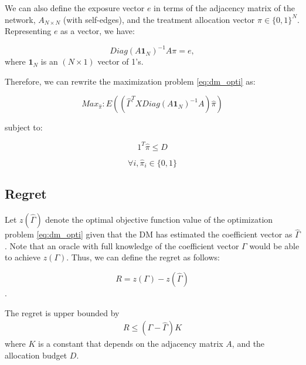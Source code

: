 \documentclass[12pt,a4paper]{article}
\begin{document}
We can also define the exposure vector $e$ in terms of the adjacency matrix of the network, $A_{N \times N}$ (with self-edges), and the treatment allocation vector $\pi \in \{0,1\}^N$.\\

Representing $e$ as a vector, we have: 

$$Diag(A \mathbf{1}_{N} ) ^{-1} A\pi  = e,$$
where $\mathbf{1}_{N}$ is an $(N \times 1)$ vector of 1's.

Therefore, we can rewrite the maximization problem \eqref{eq:dm_opti} as:

$$Max_{\hat \pi}: E \left( \left(\hat \Gamma^T X Diag(A \mathbf{1}_{N} ) ^{-1} A \right) \hat \pi \right) $$

subject to: 

$$1^T \hat \pi \leq D $$

$$\forall i, \hat \pi_i \in \{0,1\} $$


\iffalse
or, we can write: %

$$Max_{\hat \pi, y_i}: E \left( \left(\hat \Gamma^T X Diag(A \mathbf{1}_{N} ) ^{-1} A \right) \hat \pi  - \sum_{i \leq N} y_i \right)$$ subject to: 

$$\forall i,  \left( Diag(A \mathbf{1}_{N} ) ^{-1} A \hat \pi \right)_i \leq y_i$$

$$\forall i, y_i, \hat \pi_i \in \{0,1\} $$
\fi

\subsection{Regret}
Let $z(\hat \Gamma)$ denote the optimal objective function value of the optimization problem \eqref{eq:dm_opti} given that the DM has estimated the coefficient vector as $\hat{\Gamma} $. Note that an oracle with full knowledge of the coefficient vector $\Gamma$ would be able to achieve $z(\Gamma)$. Thus, we can define the regret as follows:

$$R = z(\Gamma) - z(\hat{\Gamma}) $$.

\begin{thm}
The regret is upper bounded by
\begin{align}
R \leq (\Gamma - \hat{\Gamma}) K
\end{align}
where $K$ is a constant that depends on the adjacency matrix $A$, and the allocation budget $D$.
\end{thm}
\end{document}
